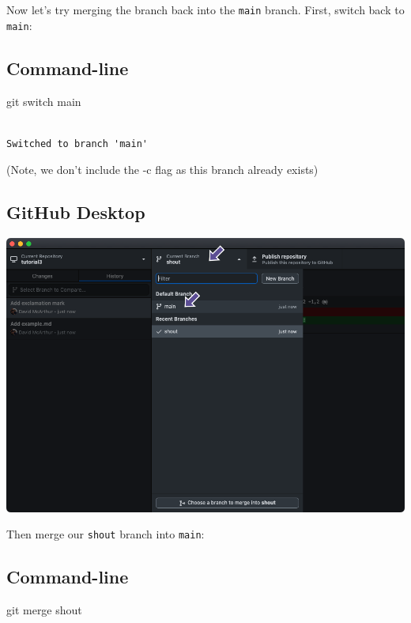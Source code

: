 \documentclass[
  letterpaper,
  DIV=11,
  numbers=noendperiod]{scrartcl}
\newenvironment{Shaded}{\begin{snugshade}}{\end{snugshade}}
\newcommand{\FunctionTok}[1]{\textcolor[rgb]{0.28,0.35,0.67}{#1}}
\newcommand{\NormalTok}[1]{\textcolor[rgb]{0.00,0.23,0.31}{#1}}
\begin{document}
Now let's try merging the branch back into the \texttt{main} branch.
First, switch back to \texttt{main}:

\subsection{Command-line}

\begin{Shaded}
\begin{Highlighting}[]
\FunctionTok{git}\NormalTok{ switch main}
\end{Highlighting}
\end{Shaded}

\begin{verbatim}

Switched to branch 'main'
\end{verbatim}

(Note, we don't include the -c flag as this branch already exists)

\subsection{GitHub Desktop}

\includegraphics{images/image32.png}

Then merge our \texttt{shout} branch into \texttt{main}:

\subsection{Command-line}

\begin{Shaded}
\begin{Highlighting}[]
\FunctionTok{git}\NormalTok{ merge shout}
\end{Highlighting}
\end{Shaded}
\end{document}
